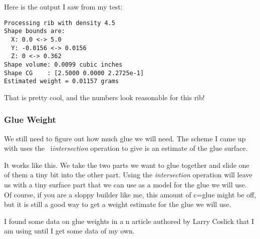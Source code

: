 Here is the output I saw from my test:

\begin{lstlisting}
Processing rib with density 4.5
Shape bounds are:
  X: 0.0 <-> 5.0
  Y: -0.0156 <-> 0.0156
  Z: 0 <-> 0.362
Shape volume: 0.0099 cubic inches
Shape CG    : [2.5000 0.0000 2.2725e-1]
Estimated weight = 0.01157 grams
\end{lstlisting}

That is pretty cool, and the numbers look reasonable for this rib!

\subsubsection{Glue Weight}

We still need to figure out how much glue we will need. The scheme I came up
with uses the \osc\ i{\it intersection} operation to give is an estimate of
the glue surface.

It works like this. We take the two parts we want to glue together and slide one of them a tiny bit into the other part. Using the {\it intersection} operation will leave us with a tiny surface part that we can use as a model for the glue we will use. Of course, if you are a sloppy builder like me, this amount of c=glue might be off, but it is still a good way to get a weight estimate for the glue we will use.

I found some data on glue weights in a n article authored by Larry Coslick that I am using until I get some data of my own.



